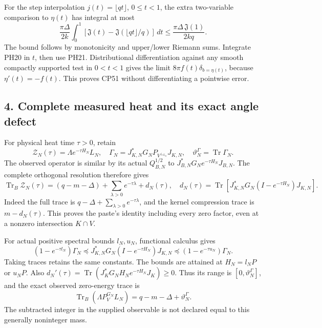 \documentclass[10pt]{article}
\begin{document}
For the step interpolation \(j(t)=\lfloor qt\rfloor\), \(0\le t<1\), the extra two-variable comparison to \(\eta(t)\) has integral at most \[
 \frac{\pi\Delta}{2k}\int_0^1[\mathfrak J(t)-\mathfrak J(\lfloor qt\rfloor/q)]\,dt
 \le \frac{\pi\Delta\,\mathfrak J(1)}{2kq}.
 \tag{PH21}
\] The bound follows by monotonicity and upper/lower Riemann sums. Integrate PH20 in \(t\), then use PH21. Distributional differentiation against any smooth compactly supported test in \(0<t<1\) gives the limit \(8\pi f(t)\delta_{b=\eta(t)}\), because \(\eta'(t)=-f(t)\). This proves CP51 without differentiating a pointwise error.

\subsection{4. Complete measured heat and its exact angle defect}\label{complete-measured-heat-and-its-exact-angle-defect}

For physical heat time \(\tau>0\), retain \[
 \mathscr Z_N(\tau)=\Lambda e^{-\tau H_N}L_N,\quad
 \Gamma_N=J_{K,N}^*G_NP_{V^{\perp_{G_N}}}J_{K,N},\quad
 \vartheta_N^\Gamma=\operatorname{Tr}\Gamma_N.
 \tag{PH22}
\] The observed operator is similar by its actual \(Q_{B,N}^{1/2}\) to \(J_{B,N}^*G_Ne^{-\tau H_N}J_{B,N}\). The complete orthogonal resolution therefore gives \[
 \operatorname{Tr}_B\mathscr Z_N(\tau)
 =(q-m-\Delta)+\sum_{\lambda>0}e^{-\tau\lambda}+d_N(\tau),
 \quad
 d_N(\tau)=\operatorname{Tr}[J_{K,N}^*G_N(I-e^{-\tau H_N})J_{K,N}].
 \tag{PH23}
\] Indeed the full trace is \(q-\Delta+\sum_{\lambda>0}e^{-\tau\lambda}\), and the kernel compression trace is \(m-d_N(\tau)\). This proves the paste's identity including every zero factor, even at a nonzero intersection \(K\cap V\).

For actual positive spectral bounds \(l_N,u_N\), functional calculus gives \[
 (1-e^{-\tau l_N})\Gamma_N
 \preceq J_{K,N}^*G_N(I-e^{-\tau H_N})J_{K,N}
 \preceq(1-e^{-\tau u_N})\Gamma_N.
 \tag{PH24}
\] Taking traces retains the same constants. The bounds are attained at \(H_N=l_NP\) or \(u_NP\). Also \(d_N'(\tau)=\operatorname{Tr}(J_K^*G_NH_Ne^{-\tau H_N}J_K)\ge0\). Thus its range is \([0,\vartheta_N^\Gamma]\), and the exact observed zero-energy trace is \[
 \operatorname{Tr}_B(\Lambda P_V^{G_N}L_N)
 =q-m-\Delta+\vartheta_N^\Gamma .
 \tag{PH25}
\] The subtracted integer in the supplied observable is not declared equal to this generally noninteger mass.
\end{document}
